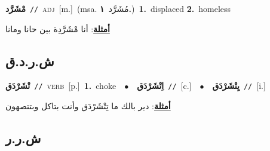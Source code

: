 \documentclass[10pt,a4paper,twoside]{article} %
\begin{document}
\begin{multicols}{2}
{\setlength\topsep{0pt}\textbf{\foreignlanguage{arabic}{مْشَرَّد}}\ {\color{gray}\texttt{//}\color{black}}\ \textsc{adj}\ [m.]\ \color{gray}(msa. \foreignlanguage{arabic}{مُشَرَّد}~\foreignlanguage{arabic}{\textbf{١.}})\color{black}\ \textbf{1.}~displaced  \textbf{2.}~homeless\  \begin{flushright}\color{gray}\foreignlanguage{arabic}{\textbf{\underline{\foreignlanguage{arabic}{أمثلة}}}: أنا مْشَرَّدِة بين حانا ومانا}\end{flushright}\color{black}} \vspace{2mm}

\vspace{-3mm}
\subsection*{\color{blue}\foreignlanguage{arabic}{ش.ر.د.ق}\color{blue}{}} 

{\setlength\topsep{0pt}\textbf{\foreignlanguage{arabic}{تْشَرْدَق}}\ {\color{gray}\texttt{//}\color{black}}\ \textsc{verb}\ [p.]\ \textbf{1.}~choke\ \ $\bullet$\ \ \setlength\topsep{0pt}\textbf{\foreignlanguage{arabic}{اِتْشَرْدَق}}\ {\color{gray}\texttt{//}\color{black}}\ [c.]\ \ $\bullet$\ \ \setlength\topsep{0pt}\textbf{\foreignlanguage{arabic}{يِتْشَرْدَق}}\ {\color{gray}\texttt{//}\color{black}}\ [i.]\  \begin{flushright}\color{gray}\foreignlanguage{arabic}{\textbf{\underline{\foreignlanguage{arabic}{أمثلة}}}: دير بالك ما تِتْشَرْدَق وأنت بتاكل وبتتصهون}\end{flushright}\color{black}} \vspace{2mm}

\vspace{-3mm}
\subsection*{\color{blue}\foreignlanguage{arabic}{ش.ر.ر}\color{blue}{}} 


\end{multicols}
\end{document}
